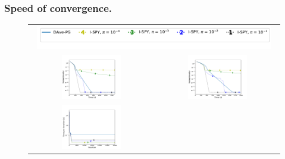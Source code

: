 \subsubsection{Speed of convergence.} 
\begin{figure}[b!]
\begin{tabular}{cc}
\multicolumn{2}{c}{\vspace{-4pt}
\includegraphics[width = 0.96\textwidth]{SODA/Figs/legend.pdf}}\\
\includegraphics[width = 0.5\textwidth]{SODA/Figs/real-sim_20w_00001_0001_fun_vs_time_log.pdf} & 
\includegraphics[width = 0.5\textwidth]{SODA/Figs/rcv_20w_00001_0001_fun_vs_time_log.pdf}\\
\includegraphics[width = 0.5\textwidth]{SODA/Figs/real-sim_20w_00001_0001_time_vs_ite.pdf} & 

\end{tabular}
\end{figure}
